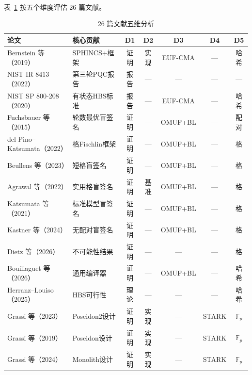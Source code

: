 \documentclass[11pt,a4paper]{ctexart}
\begin{document}
表~\ref{tab:dim} 按五个维度评估 26 篇文献。

\begin{table}[h]
\centering
\caption{26 篇文献五维分析}
\label{tab:dim}
\fontsize{8}{10}\selectfont
\begin{tabular}{@{}p{3.5cm}p{2.8cm}ccccc@{}}
\toprule
\textbf{论文} & \textbf{核心贡献} & \textbf{D1} & \textbf{D2} & \textbf{D3} & \textbf{D4} & \textbf{D5} \\
\midrule
Bernstein 等（2019）\cite{Bernstein2019SPHINCS} & SPHINCS+框架 & 证明 & 实现 & EUF-CMA & --- & 哈希 \\
NIST IR 8413（2022）\cite{NIST2022IR8413} & 第三轮PQC报告 & 报告 & --- & --- & --- & --- \\
NIST SP 800-208（2020）\cite{NIST2020SP800} & 有状态HBS标准 & 报告 & --- & EUF-CMA & --- & 哈希 \\
Fuchsbauer 等（2015）\cite{Fuchsbauer2015Practical} & 轮数最优盲签名 & 证明 & --- & OMUF+BL & --- & 配对 \\
del Pino--Katsumata（2022）\cite{delPino2022Framework} & 格Fischlin框架 & 证明 & --- & OMUF+BL & --- & 格 \\
Beullens 等（2023）\cite{Beullens2023LatticeBlind} & 短格盲签名 & 证明 & --- & OMUF+BL & --- & 格 \\
Agrawal 等（2022）\cite{Agrawal2022Practical} & 实用格盲签名 & 证明 & 基准 & OMUF+BL & --- & 格 \\
Katsumata 等（2021）\cite{Katsumata2021} & 标准模型盲签名 & 证明 & --- & OMUF+BL & --- & 格 \\
Kastner 等（2024）\cite{Kastner2024PairingFree} & 无配对盲签名 & 证明 & --- & OMUF+BL & --- & 格 \\
Dietz 等（2026）\cite{Dietz2026Impossibility} & 不可能性结果 & 证明 & --- & --- & --- & 格 \\
Bouillaguet 等（2026）\cite{Bouillaguet2026BlindingPH} & 通用编译器 & 证明 & --- & OMUF+BL & --- & 哈希 \\
Herranz--Louiso（2025）\cite{Herranz2025HashBased} & HBS可行性 & 理论 & --- & --- & --- & 哈希 \\
Grassi 等（2023）\cite{Grassi2023Poseidon2} & Poseidon2设计 & 证明 & 实现 & --- & STARK & $\mathbb{F}_p$ \\
Grassi 等（2019）\cite{Grassi2019Poseidon} & Poseidon设计 & 证明 & 实现 & --- & STARK & $\mathbb{F}_p$ \\
Grassi 等（2024）\cite{Grassi2024Monolith} & Monolith设计 & 证明 & 实现 & --- & STARK & $\mathbb{F}_p$ \\

\end{tabular}
\end{table}
\end{document}
